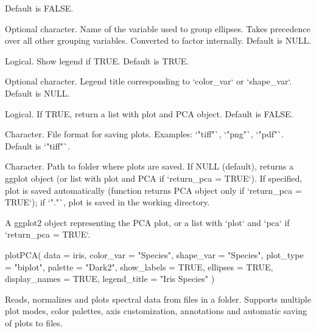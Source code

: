 \documentclass[a4paper]{book}
\begin{document}
\begin{Arguments}
\begin{ldescription}
\begin{itemize}
\end{itemize}

Default is FALSE.

\item[\code{ellipse\_var}] Optional character. Name of the variable used to group ellipses. Takes precedence over all other grouping variables. Converted to factor internally. Default is NULL.

\item[\code{display\_names}] Logical. Show legend if TRUE. Default is TRUE.

\item[\code{legend\_title}] Optional character. Legend title corresponding to `color\_var` or `shape\_var`. Default is NULL.

\item[\code{return\_pca}] Logical. If TRUE, return a list with plot and PCA object. Default is FALSE.

\item[\code{output\_format}] Character. File format for saving plots. Examples: `"tiff"`, `"png"`, `"pdf"`. Default is `"tiff"`.

\item[\code{output\_folder}] Character. Path to folder where plots are saved. If NULL (default), returns a ggplot object (or list with plot and PCA if `return\_pca = TRUE`). If specified, plot is saved automatically (function returns PCA object only if `return\_pca = TRUE`); if `"."`, plot is saved in the working directory.
\end{ldescription}
\end{Arguments}
%
\begin{Value}
A ggplot2 object representing the PCA plot, or a list with `plot` and `pca` if `return\_pca = TRUE`.
\end{Value}
%
\begin{Examples}
\begin{ExampleCode}
plotPCA(
  data = iris,
  color_var = "Species",
  shape_var = "Species",
  plot_type = "biplot",
  palette = "Dark2",
  show_labels = TRUE,
  ellipses = TRUE,
  display_names = TRUE,
  legend_title = "Iris Species"
)

\end{ExampleCode}
\end{Examples}
%
\begin{Description}
Reads, normalizes and plots spectral data from files in a folder. Supports multiple plot modes, color palettes, axis customization, annotations and automatic saving of plots to files.
\end{Description}
\end{document}
